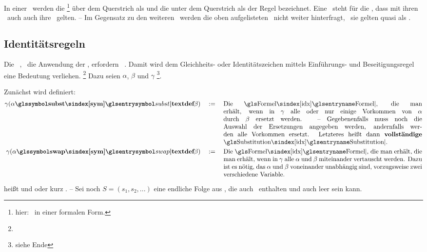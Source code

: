 {In einer \Schlussregel\ werden die \Formeln%
\footnote{hier: \Aussagen\ in einer formalen Form.}
über dem Querstrich als  und die unter dem Querstrich als  der Regel bezeichnet.
Eine \Schlussregel\ steht für die \Aussage, dass mit ihren \Voraussetzungen\ auch auch ihre \Folgerungen\ gelten.
-- Im Gegensatz zu den weiteren \Schlussregeln\ werden die oben aufgelisteten \Basisregeln\ nicht weiter hinterfragt, \textdh\ sie gelten quasi als \Axiome.

\subsection{Identitätsregeln}%
\label{sub-Identitaetsregeln}

Die \zulaessigen\ \Transformationen, \textdh\ die Anwendung der \Schlussregeln, erfordern \zulaessige\ \Substitutionen.
Damit wird dem Gleichheits- oder Identitätszeichen \chrqt{\symeq} mittels Einführungs- und Beseitigungsregel eine Bedeutung verliehen.%
\footnote{}
Dazu seien $\alpha$, $\beta$ und $\gamma$ \vergleichbare\footnote{siehe Ende }\Formeln.

Zunächst wird definiert:
\begin{align}
	\gamma(\alpha \definition{\symsubst} \beta) \quad \defeq \quad
	\parbox[t]{11cm}{%
		Die \Formel, die man erhält, wenn in $\gamma$ alle oder nur einige Vorkommen von $\alpha$ durch $\beta$ ersetzt werden.
		-- Gegebenenfalls muss noch die Auswahl der Ersetzungen angegeben werden, andernfalls werden alle Vorkommen ersetzt.
		Letzteres heißt dann \defn{vollständige} \Substitution.
	} \label{def-SubstitutionAlt}\\
	\gamma(\alpha \definition{\symswap} \beta) \quad \defeq \quad
	\parbox[t]{11cm}{%
		Die \Formel, die man erhält, die man erhält, wenn in $\gamma$ alle $\alpha$ und $\beta$ miteinander vertauscht werden.
		Dazu ist es nötig, das $\alpha$ und $\beta$ voneinander unabhängig sind, vorzugsweise zwei verschiedene Variable.
	} \label{def-Vertauschung}
\end{align}

\seqqt{$ \alpha \symsubst \beta $} heißt  und \seqqt{$ \alpha \symswap \beta $}  oder kurz .
-- Sei noch $S = (s_1, s_2, ...)$ eine endliche Folge aus \Substitutionen, die auch \Vertauschungen\ enthalten und auch leer sein kann.

}
